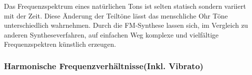Das Frequenzspektrum eines natürlichen Tons ist selten statisch sondern variiert mit der Zeit. Diese Änderung der Teiltöne lässt das menschliche Ohr Töne unterschiedlich wahrnehmen. Durch die FM-Synthese lassen sich, im Vergleich zu anderen Syntheseverfahren, auf einfachen Weg komplexe und vielfältige Frequenzspektren künstlich erzeugen.


\subsubsection{Harmonische Frequenzverhältnisse(Inkl. Vibrato)}